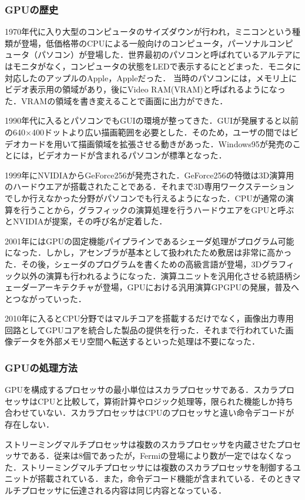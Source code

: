 \documentclass[a4j,12pt]{jsarticle}
\begin{document}
\subsubsection{GPUの歴史}
1970年代に入り大型のコンピュータのサイズダウンが行われ，ミニコンという種類が登場，低価格帯のCPUによる一般向けのコンピュータ，パーソナルコンピュータ（パソコン）が登場した．世界最初のパソコンと呼ばれているアルテアにはモニタがなく，コンピュータの状態をLEDで表示するにとどまった．モニタに対応したのアップルのApple，Appleだった．
当時のパソコンには，メモリ上にビデオ表示用の領域があり，後にVideo RAM(VRAM)と呼ばれるようになった．VRAMの領域を書き変えることで画面に出力ができた．

1990年代に入るとパソコンでもGUIの環境が整ってきた．GUIが発展すると以前の640×400ドットより広い描画範囲を必要とした．そのため，ユーザの間ではビデオカードを用いて描画領域を拡張させる動きがあった．Windows95が発売のことには，ビデオカードが含まれるパソコンが標準となった．

1999年にNVIDIAからGeForce256が発売された．GeForce256の特徴は3D演算用のハードウエアが搭載されたことである．それまで3D専用ワークステーションでしか行えなかった分野がパソコンでも行えるようになった．CPUが通常の演算を行うことから，グラフィックの演算処理を行うハードウエアをGPUと呼ぶとNVIDIAが提案，その呼び名が定着した．

2001年にはGPUの固定機能パイプラインであるシェーダ処理がプログラム可能になった．しかし，アセンブラが基本として扱われたため敷居は非常に高かった．その後，シェーダのプログラムを書くための高級言語が登場，3Dグラフィック以外の演算も行われるようになった．演算ユニットを汎用化させる統語柄シェーダーアーキテクチャが登場，GPUにおける汎用演算GPGPUの発展，普及へとつながっていった．

2010年に入るとCPU分野ではマルチコアを搭載するだけでなく，画像出力専用回路としてGPUコアを統合した製品の提供を行った．それまで行われていた画像データを外部メモリ空間へ転送するといった処理は不要になった．

\subsubsection{GPUの処理方法}
GPUを構成するプロセッサの最小単位はスカラプロセッサである．スカラプロセッサはCPUと比較して，算術計算やロジック処理等，限られた機能しか持ち合わせていない．スカラプロセッサはCPUのプロセッサと違い命令デコードが存在しない．

ストリーミングマルチプロセッサは複数のスカラプロセッサを内蔵させたプロセッサである．従来は8個であったが，Fermiの登場により数が一定ではなくなった．ストリーミングマルチプロセッサには複数のスカラプロセッサを制御するユニットが搭載されている．また，命令デコード機能が含まれている．そのときマルチプロセッサに伝達される内容は同じ内容となっている．
\end{document}
